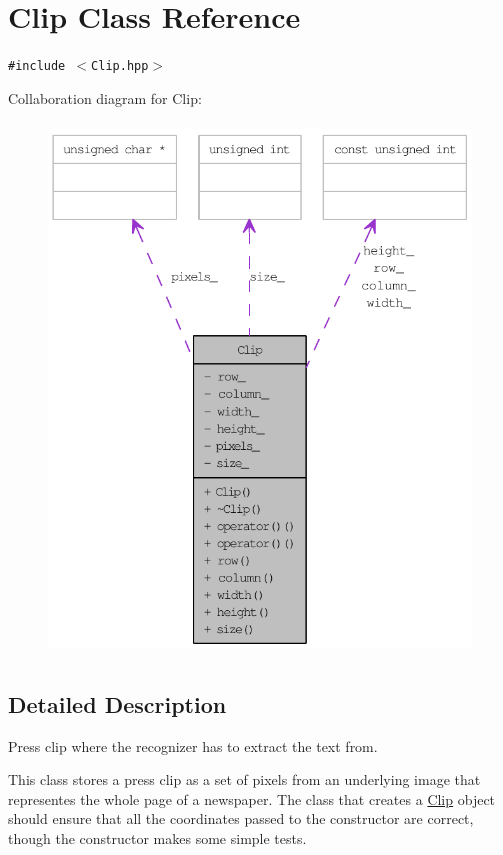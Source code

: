 \hypertarget{class_clip}{
\section{Clip Class Reference}
\label{class_clip}
}
{\tt \#include $<$Clip.hpp$>$}

Collaboration diagram for Clip:\nopagebreak
\begin{figure}[H]
\begin{center}
\leavevmode
\includegraphics[height=400pt]{class_clip__coll__graph}
\end{center}
\end{figure}


\subsection{Detailed Description}
Press clip where the recognizer has to extract the text from. 

This class stores a press clip as a set of pixels from an underlying image that representes the whole page of a newspaper. The class that creates a \hyperlink{class_clip}{Clip} object should ensure that all the coordinates passed to the constructor are correct, though the constructor makes some simple tests.


